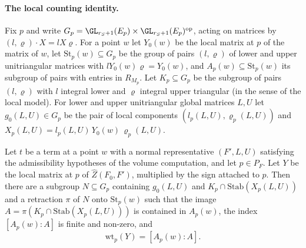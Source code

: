\paragraph{The local counting identity.} Fix $p$ and write $G_p=\GL_{r_S+1}(E_p)\times\GL_{r_S+1}(E_p)^{\mathrm{op}}$, acting on matrices by
$(l,\varrho)\cdot X=lX\varrho$. For a point $w$ let $Y_0(w)$ be the local matrix at $p$ of the matrix of $w$, let $\mathrm{St}_p(w)\subseteq G_p$ be the
group of pairs $(l,\varrho)$ of lower and upper unitriangular matrices with $lY_0(w)\varrho=Y_0(w)$, and $A_p(w)\subseteq\mathrm{St}_p(w)$ its subgroup
of pairs with entries in $R_{M_p}$. Let $K_p\subseteq G_p$ be the subgroup of pairs $(l,\varrho)$ with $l$ integral lower and $\varrho$ integral
upper triangular (in the sense of the local model). For lower and upper unitriangular global matrices $L,U$ let $g_0(L,U)\in G_p$ be the
pair of local components $(l_p(L,U),\varrho_p(L,U))$ and $X_p(L,U)=l_p(L,U)\,Y_0(w)\,\varrho_p(L,U)$.

\begin{proposition}\label{pf:thmS-leaves:prop:countat}
Let $t$ be a term at a point $w$ with a normal representative $(F',L,U)$ satisfying the admissibility hypotheses of the volume
computation, and let $p\in P_F$. Let $Y$ be the local matrix at $p$ of $\widehat Z(F_0,F')$, multiplied by the sign attached to $p$. Then there
are a subgroup $N\subseteq G_p$ containing $g_0(L,U)$ and $K_p\cap\mathrm{Stab}(X_p(L,U))$ and a retraction $\pi$ of $N$ onto $\mathrm{St}_p(w)$ such that
the image $A=\pi(K_p\cap\mathrm{Stab}(X_p(L,U)))$ is contained in $A_p(w)$, the index $[A_p(w):A]$ is finite and non-zero, and
\[
\mathrm{wt}_p(Y)=[A_p(w):A].
\]
\end{proposition}

